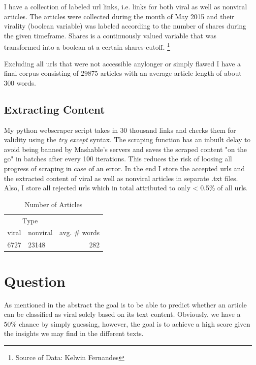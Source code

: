 \documentclass[twoside,twocolumn]{article}
\begin{document}
I have a collection of labeled url links, i.e. links for both viral as well as nonviral articles. The articles were collected during the month of May 2015 and their virality (boolean variable) was labeled according to the number of shares during the given timeframe. Shares is a continuously valued variable that was transformed into a boolean at a certain shares-cutoff. \footnote{Source of Data: Kelwin Fernandes}

Excluding all urls that were not accessible anylonger or simply flawed I have a final corpus consisting of 29875 articles with an average article length of about 300 words.

\subsection{Extracting Content}
My python webscraper script takes in 30 thousand links and checks them for validity using the \emph{try except} syntax. The scraping function has an inbuilt delay to avoid being banned by Mashable's servers and saves the scraped content "on the go" in batches after every 100 iterations. This reduces the risk of loosing all progress of scraping in case of an error.
In the end I store the accepted urls and the extracted content of viral as well as nonviral articles in separate .txt files. Also, I store all rejected urls which in total attributed to only < 0.5\% of all urls.

\begin{table}[!htb]
\caption{Number of Articles}
\centering
\begin{tabular}{llr}
\toprule
\multicolumn{2}{c}{Type} \\
\cmidrule(r){1-2}
viral & nonviral & avg. \# words \\
\midrule
6727 & 23148 & 282 \\
\end{tabular}
\end{table}


\section{Question}
As mentioned in the abstract the goal is to be able to predict whether an article can be classified as viral solely based on its text content. 
Obviously, we have a 50\% chance by simply guessing, however, the goal is to achieve a high score given the insights we may find in the different texts.
\end{document}
